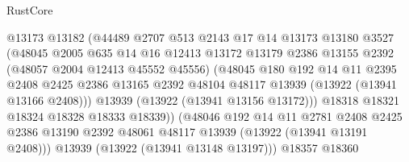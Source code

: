 \begin{lexlean}{RustCore}
\begin{coremodule}
                              @13173
                              @13182
                              (@44489
                                @2707
                                @513
                                @2143
                                @17
                                @14
                                @13173
                                @13180
                                @3527
                                (@48045
                                  @2005
                                  @635
                                  @14
                                  @16
                                  @12413
                                  @13172
                                  @13179
                                  @2386
                                  @13155
                                  @2392
                                  (@48057 @2004 @12413 @45552 @45556)
                                  (@48045
                                    @180
                                    @192
                                    @14
                                    @11
                                    @2395
                                    @2408
                                    @2425
                                    @2386
                                    @13165
                                    @2392
                                    @48104
                                    @48117
                                    @13939
                                    (@13922 (@13941 @13166 @2408)))
                                  @13939
                                  (@13922 (@13941 @13156 @13172)))
                                @18318
                                @18321
                                @18324
                                @18328
                                @18333
                                @18339))
                            (@48046
                              @192
                              @14
                              @11
                              @2781
                              @2408
                              @2425
                              @2386
                              @13190
                              @2392
                              @48061
                              @48117
                              @13939
                              (@13922 (@13941 @13191 @2408)))
                            @13939
                            (@13922 (@13941 @13148 @13197)))
                          @18357
                          @18360

\end{coremodule}
\end{lexlean}
